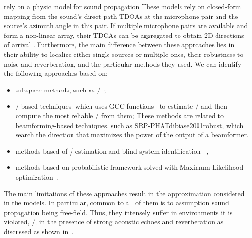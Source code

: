  rely on a physic model for sound propagation 
These models rely on closed-form mapping from the sound's direct path \acl{TDOAs} at the microphone pair and the source's azimuth angle in this pair.
If multiple microphone pairs are available and form a non-linear array, their TDOAs can be aggregated to obtain 2D directions of arrival .
Furthermore, the main difference between these approaches lies in their ability to localize either single sources or multiple ones, their robustness to noise and reverberation, and the particular methods they used.
We can identify the following approaches based on:
\begin{itemize}
    \item subspace methods, such as \MUSIC/~;
    \item \TDOA/-based techniques, which uses \ac{GCC} functions~ to estimate \TDOA/ and then compute the most reliable \DOA/ from them;
    These methods are related to beamforming-based techniques, such as SRP-PHAT\ac{dibiase2001robust}, which search the direction that maximizes the power of the output of a beamformer.
    \item methods based of \RIRs/ estimation and blind system identification ~,
    \item methods based on probabilistic framework solved with Maximum Likelihood optimization~.
\end{itemize}
The main limitations of these approaches result in the approximation considered in the models.
In particular, common to all of them is to assumption sound propagation being free-field.
Thus, they intensely suffer in environments it is violated, \eg/, in the presence of strong acoustic echoes and reverberation as discussed as shown in~.

